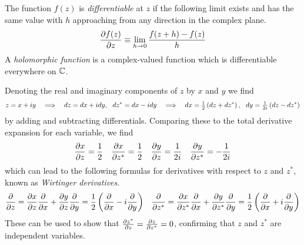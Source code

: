 \documentclass[11pt]{article}
\numberwithin{equation}{section}
\begin{document}
\begin{dfn}
\label{dfn:holomorphic-function}
The function $f(z)$ is \textit{differentiable} at $z$ if the following limit exists and
has the same value with $h$ approaching from any direction in the complex plane.
\begin{align}
  \frac {\partial f(z)}{\partial z}
\equiv
  \lim_{h\rightarrow0}
  \frac {f(z+h)-f(z)}{h}
\end{align}
A \textit{holomorphic function} is a complex-valued function which is differentiable everywhere on $\mathbb{C}$.
\end{dfn}

\begin{dfn}
Denoting the real and imaginary components of $z$ by $x$ and $y$ we find
\begin{align}
  z
=
  x
+
  iy
&&
\implies
&&
  dz
=
  dx
+
  idy
,\ \ 
  dz^*
=
  dx
-
  idy
&&
\implies
&&
  dx
=
  \tfr{1}{2}
  \pr{
    dz
  +
    dz^*
  }
,\ \ 
  dy
=
  \tfr{1}{2i}
  \pr{
    dz
  -
    dz^*
  }
\end{align}
by adding and subtracting differentials.
Comparing these to the total derivative expansion for each variable, we find
\begin{align}
  \frac {\partial x}{\partial z}
=
  \frac {1}{2}
&&
  \frac {\partial x}{\partial z^*}
=
  \frac {1}{2}
&&
  \frac {\partial y}{\partial z}
=
  \frac {1}{2i}
&&
  \frac {\partial y}{\partial z^*}
=
-
  \frac {1}{2i}
\end{align}
which can lead to the following formulas for derivatives with respect to $z$ and $z^*$, known as \textit{Wirtinger derivatives}.
\begin{align}
  \frac {\partial}{\partial z}
=
  \frac {\partial x}{\partial z}
  \frac {\partial}{\partial x}
+
  \frac {\partial y}{\partial z}
  \frac {\partial}{\partial y}
=
  \frac {1}{2}
  \left(
    \frac {\partial}{\partial x}
  -
    i
    \frac {\partial}{\partial y}
  \right)
&&
  \frac {\partial}{\partial z^*}
=
  \frac {\partial x}{\partial z^*}
  \frac {\partial}{\partial x}
+
  \frac {\partial y}{\partial z^*}
  \frac {\partial}{\partial y}
=
  \frac {1}{2}
  \left(
    \frac {\partial}{\partial x}
  +
    i
    \frac {\partial}{\partial y}
  \right)
\end{align}
These can be used to show that $\frac {\partial z^*}{\partial z}=\frac {\partial z}{\partial z^*}=0$, confirming that $z$ and $z^*$ are independent variables.
\end{dfn}
\end{document}
